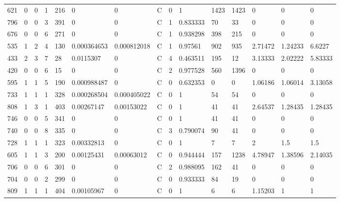 \begin{latin}
\begin{longtable}{lllllllllllllll}
	621 & 0  & 0   & 1  & 216 & 0              & 0              & C & 0  & 1        & 1423 & 1423 & 0       & 0       & 0       \\
	796 & 0  & 0   & 3  & 391 & 0              & 0              & C & 1  & 0.833333 & 70   & 33   & 0       & 0       & 0       \\
	676 & 0  & 0   & 6  & 271 & 0              & 0              & C & 1  & 0.938298 & 398  & 215  & 0       & 0       & 0       \\
	535 & 1  & 2   & 4  & 130 & 0.000364653    & 0.000812018    & C & 1  & 0.97561  & 902  & 935  & 2.71472 & 1.24233 & 6.6227  \\
	433 & 2  & 3   & 7  & 28  & 0.0115307      & 0              & C & 4  & 0.463511 & 195  & 12   & 3.13333 & 2.02222 & 5.83333 \\
	420 & 0  & 0   & 6  & 15  & 0              & 0              & C & 2  & 0.977528 & 560  & 1396 & 0       & 0       & 0       \\
	595 & 1  & 1   & 5  & 190 & 0.000988487    & 0              & C & 0  & 0.632353 & 0    & 0    & 1.06186 & 1.06014 & 3.13058 \\
	733 & 1  & 1   & 1  & 328 & 0.000268504    & 0.000405022    & C & 0  & 1        & 54   & 54   & 0       & 0       & 0       \\
	808 & 1  & 3   & 1  & 403 & 0.00267147     & 0.00153022     & C & 0  & 1        & 41   & 41   & 2.64537 & 1.28435 & 1.28435 \\
	746 & 0  & 0   & 5  & 341 & 0              & 0              & C & 0  & 1        & 41   & 41   & 0       & 0       & 0       \\
	740 & 0  & 0   & 8  & 335 & 0              & 0              & C & 3  & 0.790074 & 90   & 41   & 0       & 0       & 0       \\
	728 & 1  & 1   & 1  & 323 & 0.00332813     & 0              & C & 0  & 1        & 7    & 7    & 2       & 1.5     & 1.5     \\
	605 & 1  & 1   & 3  & 200 & 0.00125431     & 0.00063012     & C & 0  & 0.944444 & 157  & 1238 & 4.78947 & 1.38596 & 2.14035 \\
	706 & 0  & 0   & 6  & 301 & 0              & 0              & C & 2  & 0.988095 & 162  & 41   & 0       & 0       & 0       \\
	704 & 0  & 0   & 2  & 299 & 0              & 0              & C & 0  & 0.933333 & 84   & 19   & 0       & 0       & 0       \\
	809 & 1  & 1   & 1  & 404 & 0.00105967     & 0              & C & 0  & 1        & 6    & 6    & 1.15203 & 1       & 1       \\

\end{longtable}
\end{latin}
